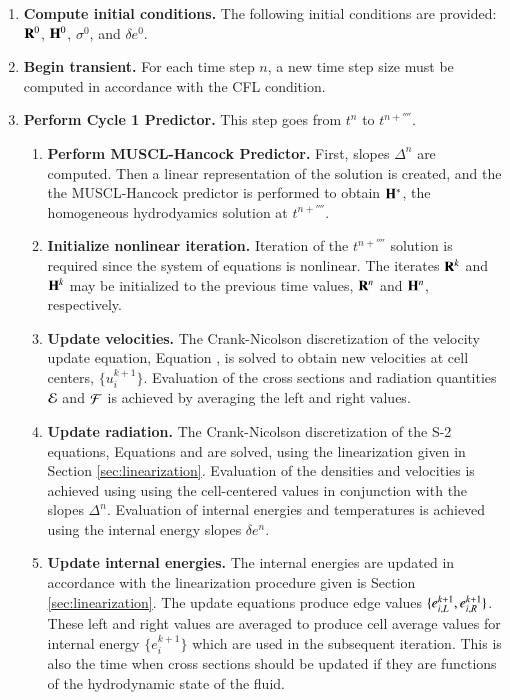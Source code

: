 \begin{enumerate}

\item \textbf{Compute initial conditions.} The following initial conditions
are provided: $\mathbf{R}^0$, $\mathbf{H}^0$, $\sigma^0$, and $\delta e^0$.

\item \textbf{Begin transient.} For each time step $n$, a new time step
size must be computed in accordance with the CFL condition.


\item \textbf{Perform Cycle 1 Predictor.} This step goes from
$t^n$ to $t^{n+\fourth}$.

\begin{enumerate}
\item \textbf{Perform MUSCL-Hancock Predictor.} First, slopes $\Delta^n$ are
computed.
Then a linear representation of the solution is created, and the
the MUSCL-Hancock predictor is performed to obtain $\mathbf{H}^*$, the
homogeneous hydrodyamics solution at $t^{n+\fourth}$.

\item \textbf{Initialize nonlinear iteration.} Iteration of the
$t^{n+\fourth}$ solution is required since the system of equations
is nonlinear. The iterates $\mathbf{R}^k$ and $\mathbf{H}^k$ may be initialized
to the previous time
values, $\mathbf{R}^n$ and $\mathbf{H}^n$, respectively.

\item\label{item:vel_update}
\textbf{Update velocities.} The Crank-Nicolson discretization
of the velocity update equation, Equation ,
is solved to obtain new
velocities at cell centers, $\{u_i^{k+1}\}$. Evaluation of
the cross sections and radiation quantities $\mathcal{E}$ and $\mathcal{F}$
is achieved by averaging the left and right values.

\item \textbf{Update radiation.} The Crank-Nicolson discretization of the S-2
equations, Equations  and  are solved, using
the linearization given in Section \ref{sec:linearization}. Evaluation
of the densities and velocities is achieved using using the cell-centered values
in conjunction with the slopes $\Delta^n$. Evaluation of internal
energies and temperatures is achieved using the internal energy slopes
$\delta e^n$.

\item \textbf{Update internal energies.} The internal energies are
updated in accordance with the linearization procedure given is Section
\ref{sec:linearization}. The update equations produce edge values
$\{e^{k+1}_{i,L},e^{k+1}_{i,R}\}$. These left and right values are
averaged to produce cell average values for internal energy $\{e^{k+1}_i\}$
which are used in the subsequent iteration.
This is also the time when cross sections should be updated
if they are functions of the hydrodynamic state of the fluid.


\end{enumerate}
\end{enumerate}
